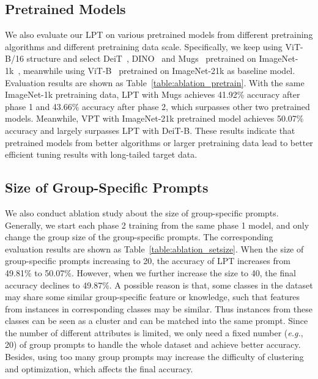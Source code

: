 \documentclass{article} \usepackage{iclr2023_conference,times}
\begin{document}
\subsection{Pretrained Models}\label{sec:pretrained_models}
We also evaluate our LPT on various pretrained models from different pretraining algorithms and different pretraining data scale. Specifically, we keep using ViT-B/16 structure and select DeiT~\citep{pmlr-v139-touvron21a}, DINO~\citep{caron2021emerging} and Mugs~\citep{zhou2022mugs} pretrained on ImageNet-1k~\citep{deng2009imagenet}, meanwhile using ViT-B~\citep{dosovitskiy2021an} pretrained on ImageNet-21k as baseline model. Evaluation results are shown as Table~\ref{table:ablation_pretrain}. With the same ImageNet-1k pretraining data, LPT with Mugs achieves 41.92\% accuracy after phase 1 and 43.66\% accuracy after phase 2, which surpasses other two pretrained models. Meanwhile, VPT with ImageNet-21k pretrained model achieves 50.07\% accuracy and largely surpasses LPT with DeiT-B.
These results indicate that pretrained models from better algorithms or larger pretraining data lead to better efficient tuning results with long-tailed target data.

\subsection{Size of Group-Specific Prompts}\label{sec:ablation_setsize}
We also conduct ablation study about the size of group-specific prompts. Generally, we start each phase 2 training from the same phase 1 model, and only change the group size of the group-specific prompts. 
The corresponding evaluation results are shown as Table~\ref{table:ablation_setsize}. When the size of group-specific prompts increasing to 20, the accuracy of LPT increases from 49.81\% to 50.07\%. However, when we further increase the size to 40, the final accuracy declines to 49.87\%. 
A possible reason is that, some classes in the dataset may share some similar group-specific feature or knowledge, such that features from instances in corresponding classes may be similar. Thus instances from these classes can be seen as a cluster and can be matched into the same prompt. Since the number of different attributes is limited, we only need a fixed number (\textit{e.g.}, 20) of group prompts to handle the whole dataset and achieve better accuracy. Besides, using too many group prompts may increase the difficulty of clustering and optimization, which affects the final accuracy. 
\end{document}
